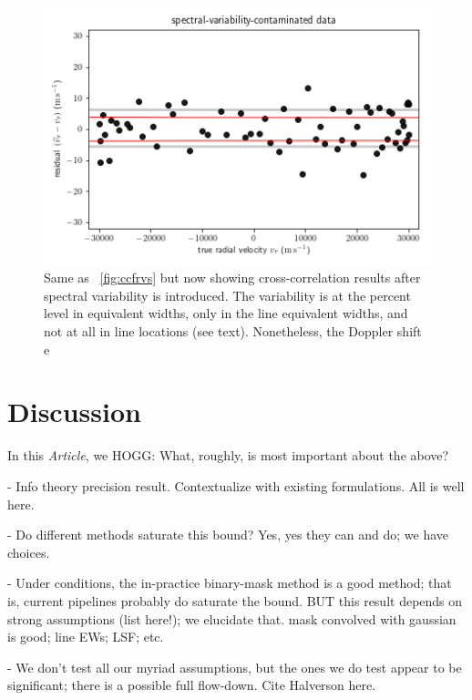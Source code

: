 \documentclass[modern]{aastex631}
\newcommand{\documentname}{\textsl{Article}}
\newcommand{\figref}[1]{\figurename~\ref{#1}}
\begin{document}
\begin{figure}[tp]
  \begin{mdframed}
    \begin{center}
    \includegraphics[width=\textwidth]{../notebook/variable.png}
    \end{center}
    \caption{Same as \figref{fig:ccfrvs} but now showing cross-correlation results after spectral variability is introduced. The variability is at the percent level in equivalent widths, only in the line equivalent widths, and not at all in line locations (see text). Nonetheless, the Doppler shift e\label{fig:variable}}
  \end{mdframed}
\end{figure}

\section{Discussion}\label{sec:discussion}

In this \documentname, we HOGG: What, roughly, is most important about the above?

- Info theory precision result. Contextualize with existing formulations. All is well here.

- Do different methods saturate this bound? Yes, yes they can and do; we have choices.

- Under conditions, the in-practice binary-mask method is a good method; that is, current pipelines probably do saturate the bound. BUT this result depends on strong assumptions (list here!); we elucidate that. mask convolved with gaussian is good; line EWs; LSF; etc.

- We don't test all our myriad assumptions, but the ones we do test appear to be significant; there is a possible full flow-down. Cite Halverson here.
\end{document}

